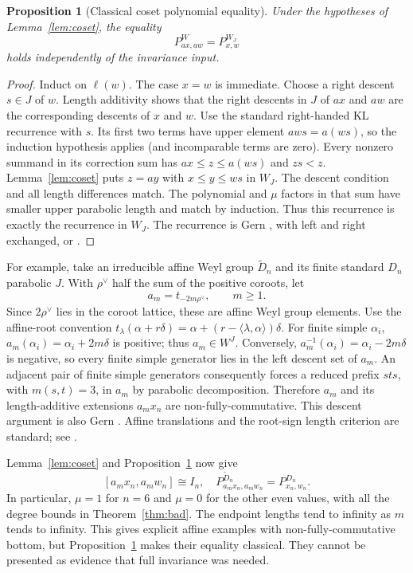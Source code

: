 \documentclass[11pt]{article}
\newtheorem{proposition}[theorem]{Proposition}
\theoremstyle{definition}\newtheorem{definition}[theorem]{Definition}
\theoremstyle{remark}\newtheorem{remark}[theorem]{Remark}
\begin{document}
\begin{proposition}[Classical coset polynomial equality]\label{prop:coset}
Under the hypotheses of Lemma~\ref{lem:coset}, the equality
\[
 P^W_{ax,aw}=P^{W_J}_{x,w}
\]
holds independently of the invariance input.
\end{proposition}
\begin{proof}
Induct on $\ell(w)$. The case $x=w$ is immediate. Choose a right
descent $s\in J$ of $w$. Length additivity shows that the right descents
in $J$ of $ax$ and $aw$ are the corresponding descents of $x$ and $w$.
Use the standard right-handed KL recurrence with $s$.
Its first two terms have upper element $aws=a(ws)$, so the induction
hypothesis applies (and incomparable terms are zero).
Every nonzero summand in its correction sum has
$ax\leq z\leq a(ws)$ and $zs<z$. Lemma~\ref{lem:coset} puts $z=ay$
with $x\leq y\leq ws$ in $W_J$.
The descent condition and all length differences match. The polynomial
and $\mu$ factors in that sum have smaller upper parabolic length and
match by induction. Thus this recurrence is exactly the recurrence
in $W_J$. The recurrence is Gern \cite[Proposition 1.2.6]{gern},
with left and right exchanged, or \cite[Section 6.1]{bb}.
\end{proof}

For example, take an irreducible affine Weyl group $\widetilde D_n$ and
its finite standard $D_n$ parabolic $J$. With $\rho^\vee$ half the sum
of the positive coroots, let
\[
 a_m=t_{-2m\rho^\vee},\qquad m\geq1.
\]
Since $2\rho^\vee$ lies in the coroot lattice, these are affine Weyl
group elements. Use the affine-root convention
$t_\lambda(\alpha+r\delta)=\alpha+(r-\langle\lambda,\alpha\rangle)\delta$.
For finite simple $\alpha_i$, $a_m(\alpha_i)=\alpha_i+2m\delta$ is positive;
thus $a_m\in W^J$. Conversely,
$a_m^{-1}(\alpha_i)=\alpha_i-2m\delta$ is negative, so every finite
simple generator lies in the left descent set of $a_m$.
An adjacent pair of finite simple generators consequently forces a
reduced prefix $sts$, with $m(s,t)=3$, in $a_m$ by parabolic
decomposition. Therefore $a_m$ and its length-additive extensions
$a_m x_n$ are non-fully-commutative. This descent argument is also
Gern \cite[Lemma 1.1.21 and Corollary 1.1.22]{gern}.
Affine translations and the root-sign length criterion are standard;
see \cite[Chapters 4 and 5]{humphreys}.

Lemma~\ref{lem:coset} and Proposition~\ref{prop:coset} now give
\[
 [a_mx_n,a_mw_n]\cong I_n,
 \quad P^{\widetilde D_n}_{a_mx_n,a_mw_n}=P^{D_n}_{x_n,w_n}.
\]
In particular, $\mu=1$ for $n=6$ and $\mu=0$ for the other even
values, with all the degree bounds in Theorem~\ref{thm:bad}.
The endpoint lengths tend to infinity as $m$ tends to infinity.
This gives explicit affine examples with non-fully-commutative bottom,
but Proposition~\ref{prop:coset} makes their equality classical.
They cannot be presented as evidence that full invariance was needed.
\end{document}
